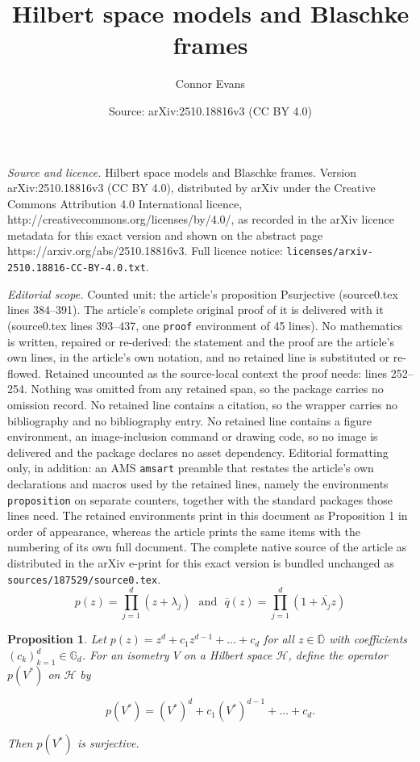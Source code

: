 \documentclass[10pt,a4paper]{amsart}
\title{Hilbert space models and Blaschke frames}
\author{Connor Evans}
\date{Source: arXiv:2510.18816v3 (CC BY 4.0)}
\newtheorem{proposition}{Proposition}
\begin{document}
\maketitle

\noindent\emph{Source and licence.} Hilbert space models and Blaschke frames. Version arXiv:2510.18816v3 (CC BY 4.0), distributed by arXiv under the Creative Commons Attribution 4.0 International licence, http://creativecommons.org/licenses/by/4.0/, as recorded in the arXiv licence metadata for this exact version and shown on the abstract page https://arxiv.org/abs/2510.18816v3. Full licence notice: \texttt{licenses/arxiv-2510.18816-CC-BY-4.0.txt}.\par\smallskip

\noindent\textit{Editorial scope.} Counted unit: the article's proposition Psurjective (source0.tex lines 384--391). The article's complete original proof of it is delivered with it (source0.tex lines 393--437, one \texttt{proof} environment of 45 lines). No mathematics is written, repaired or re-derived: the statement and the proof are the article's own lines, in the article's own notation, and no retained line is substituted or re-flowed.  Retained uncounted as the source-local context the proof needs: lines 252--254.  Nothing was omitted from any retained span, so the package carries no omission record.  No retained line contains a citation, so the wrapper carries no bibliography and no bibliography entry.  No retained line contains a figure environment, an image-inclusion command or drawing code, so no image is delivered and the package declares no asset dependency.  Editorial formatting only, in addition: an AMS \texttt{amsart} preamble that restates the article's own declarations and macros used by the retained lines, namely the environments \texttt{proposition} on separate counters, together with the standard packages those lines need.  The retained environments print in this document as Proposition 1 in order of appearance, whereas the article prints the same items with the numbering of its own full document.  The complete native source of the article as distributed in the arXiv e-print for this exact version is bundled unchanged as \texttt{sources/187529/source0.tex}.
\begin{equation}\label{factorisation}
    p(z) = \prod_{j=1}^{d}(z+\lambda_{j})~~~\text{and}~~~\overline{q}(z)=\prod_{j=1}^{d}(1+\overline{\lambda_{j}}z)
\end{equation}

\begin{proposition}\label{Psurjective}
Let $p(z)=z^{d}+c_{1}z^{d-1}+\hdots+c_{d}$ for all $z\in\overline{\mathbb{D}}$ with coefficients $(c_{k})_{k=1}^{d}\in\mathbb{G}_{d}$. For an isometry $V$ on a Hilbert space $\mathcal{H}$, define the operator $p(V^{*})$ on $\mathcal{H}$ by

$$p(V^{*})=(V^{*})^{d}+c_{1}(V^{*})^{d-1}+\hdots +c_{d}.$$

\noindent Then $p(V^{*})$ is surjective.

\end{proposition}
\end{document}

